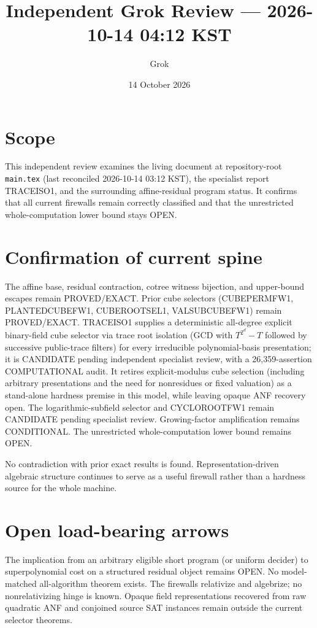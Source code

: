 \documentclass[11pt]{article}
\title{Independent Grok Review --- 2026-10-14 04:12 KST}
\author{Grok}
\date{14 October 2026}
\begin{document}
\maketitle

\begin{center}
\end{center}

\section{Scope}
This independent review examines the living document at repository-root \texttt{main.tex} (last reconciled 2026-10-14 03:12 KST), the specialist report TRACEISO1, and the surrounding affine-residual program status. It confirms that all current firewalls remain correctly classified and that the unrestricted whole-computation lower bound stays OPEN.

\section{Confirmation of current spine}
The affine base, residual contraction, cotree witness bijection, and upper-bound escapes remain PROVED/EXACT. Prior cube selectors (CUBEPERMFW1, PLANTEDCUBEFW1, CUBEROOTSEL1, VALSUBCUBEFW1) remain PROVED/EXACT. TRACEISO1 supplies a deterministic all-degree explicit binary-field cube selector via trace root isolation (GCD with $T^{2^d}-T$ followed by successive public-trace filters) for every irreducible polynomial-basis presentation; it is CANDIDATE pending independent specialist review, with a 26,359-assertion COMPUTATIONAL audit. It retires explicit-modulus cube selection (including arbitrary presentations and the need for nonresidues or fixed valuation) as a stand-alone hardness premise in this model, while leaving opaque ANF recovery open. The logarithmic-subfield selector and CYCLOROOTFW1 remain CANDIDATE pending specialist review. Growing-factor amplification remains CONDITIONAL. The unrestricted whole-computation lower bound remains OPEN.

No contradiction with prior exact results is found. Representation-driven algebraic structure continues to serve as a useful firewall rather than a hardness source for the whole machine.

\section{Open load-bearing arrows}
The implication from an arbitrary eligible short program (or uniform decider) to superpolynomial cost on a structured residual object remains OPEN. No model-matched all-algorithm theorem exists. The firewalls relativize and algebrize; no nonrelativizing hinge is known. Opaque field representations recovered from raw quadratic ANF and conjoined source SAT instances remain outside the current selector theorems.
\end{document}
